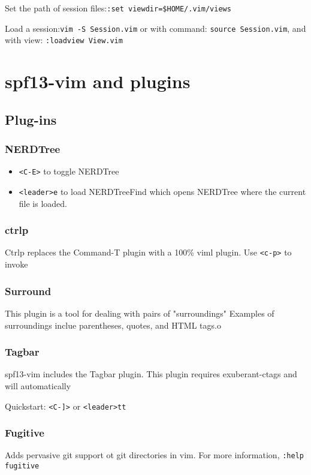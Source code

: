 \documentclass[11pt]{book}
\begin{document}
Set the path of session files:\verb|:set viewdir=$HOME/.vim/views|

Load a session:\verb|vim -S Session.vim| or with command:
\verb|source Session.vim|, and with view: \verb|:loadview View.vim|




\chapter{spf13-vim and plugins}
 \section{Plug-ins}
 \subsection{NERDTree}
 \begin{itemize}
        \item \verb|<C-E>| to toggle NERDTree
        \item \verb|<leader>e| to load NERDTreeFind which opens NERDTree where 
             the current file is loaded.
 \end{itemize}
 \subsection{ctrlp}
 Ctrlp replaces the Command-T plugin with a 100\% viml plugin. Use \verb|<c-p>| 
 to invoke
 \subsection{Surround}
 This plugin is a tool for dealing with pairs of "surroundings" Examples of 
 surroundings inclue parentheses, quotes, and HTML tags.o
 \subsection{Tagbar}
 spf13-vim includes the Tagbar plugin. This plugin requires exuberant-ctags 
 and will automatically 

 Quickstart: \verb|<C-]>| or \verb|<leader>tt|
 \subsection{Fugitive}
 Adds pervasive git support ot git directories in vim. For more information, 
 \verb|:help fugitive|
\end{document}
